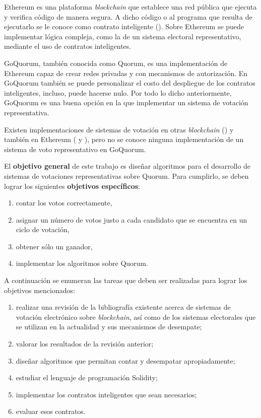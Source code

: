 Ethereum es una plataforma \textit{blockchain} que establece una red p\'ublica que ejecuta y verifica c\'odigo de manera segura.   A dicho c\'odigo o al programa que resulta de ejecutarlo se le conoce como contrato inteligente (\cite{eth-aws}). Sobre Ethereum se puede implementar l\'ogica compleja, como  la de un sistema electoral representativo, mediante el uso de contratos inteligentes.  

GoQuorum, tambi\'en conocida como Quorum, es una implementaci\'on de Ethereum capaz de crear redes privadas y con mecanismos de autorizaci\'on. En GoQuorum tambi\'en se puede personalizar el costo del despliegue de los contratos inteligentes, incluso, puede hacerse nulo. Por todo lo dicho anteriormente, GoQuorum es una buena opci\'on en la que implementar un sistema de votaci\'on representativa.


Existen implementaciones de sistemas de votaci\'on en otras \textit{blockchain} (\cite{agora}) y tambi\'en en Ethereum (\cite{ovn} y \cite{borda_count}), pero no se conoce ninguna implementaci\'on de un sistema de voto representativo en GoQuorum.

El \textbf{objetivo general} de este trabajo es dise\~nar algoritmos para el desarrollo de sistemas de votaciones representativas sobre Quorum. Para cumplirlo, se deben lograr los siguientes \textbf{objetivos espec\'ificos}:
\begin{enumerate}
    \item contar los votos correctamente,
    \item asignar un n\'umero de votos justo a cada candidato que se encuentra en un ciclo de votaci\'on,
    \item obtener s\'olo un ganador,
    \item implementar los algoritmos sobre Quorum.
\end{enumerate}


A continuaci\'on se enumeran las tareas que deben ser realizadas para lograr los objetivos mencionados:
\begin{enumerate}
    \item realizar una revisi\'on de la bibliograf\'ia existente acerca de sistemas de votaci\'on electr\'onico sobre \textit{blockchain}, as\'i como de los sistemas electorales que se utilizan en la actualidad y sus mecanismos de desempate;
    \item valorar los resultados de la revisi\'on anterior;
    \item dise\~nar algoritmos que permitan contar y desempatar apropiadamente;
    \item estudiar el lenguaje de programaci\'on Solidity;
    \item implementar los contratos inteligentes que sean necesarios;
    \item evaluar esos contratos.
\end{enumerate}

